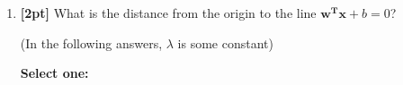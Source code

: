 \documentclass[12pt]{article}
\renewcommand{\circle}{\tikz\draw[black] (0,0) circle (1ex);}
\begin{document}
\begin{enumerate}
    
    \item \textbf{[2pt]} What is the distance from the origin to the line $\mathbf{w^Tx}+b=0$?
    
    (In the following answers, $\lambda$ is some constant)
    
    \textbf{Select one:}


  

    \clearpage
\end{enumerate}
\end{document}

